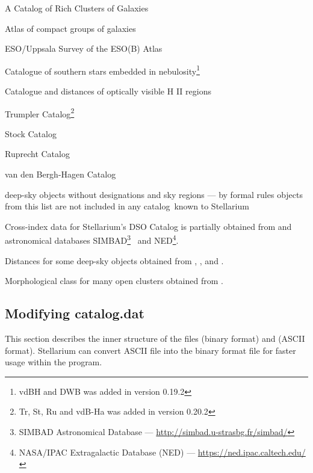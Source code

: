 \begin{description}[align=right,labelwidth=2cm]
\item[\textbf{Abell}]  A Catalog of Rich Clusters of Galaxies~\citep{1989ApJS...70....1A}
\item[\textbf{HCG}]  Atlas of compact groups of galaxies~\citep{1993ApL....29....1H}
\item[\textbf{ESO}]  ESO/Uppsala Survey of the ESO(B) Atlas~\citep{1982ESO...C......0L}
\item[\textbf{vdBH}]  Catalogue of southern stars embedded in nebulosity\footnote{vdBH and DWB was added in version 0.19.2}~\citep{1975AJ.....80..208V}
\item[\textbf{DWB}]  Catalogue and distances of optically visible H II regions~\citep{1969A&A.....1..270D}
\item[\textbf{Tr}]  Trumpler Catalog\footnote{Tr, St, Ru and vdB-Ha was added in version 0.20.2}
\item[\textbf{St}]  Stock Catalog
\item[\textbf{Ru}]  Ruprecht Catalog
\item[\textbf{vdB-Ha}]  van den Bergh-Hagen Catalog~\citep{1975AJ.....80...11V}
\item[\textbf{Other}] deep-sky objects without designations and sky regions --- by formal rules objects from this list are not included in any catalog known to Stellarium
\end{description}

\noindent Cross-index data for Stellarium's DSO Catalog is partially obtained from 
 and astronomical databases 
SIMBAD\footnote{SIMBAD Astronomical Database --- \url{http://simbad.u-strasbg.fr/simbad/}}~\citep{2000A&AS..143....9W} 
and NED\footnote{NASA/IPAC Extragalactic Database (NED) --- \url{https://ned.ipac.caltech.edu/}}.

\noindent Distances for some deep-sky objects obtained from , ,  and .

\noindent Morphological class for many open clusters obtained from .

\subsection{Modifying catalog.dat}
\label{sec:dso:modifyingCatalog.dat}

This section describes the inner structure of the files 
(binary format) and  (ASCII format).
Stellarium can convert ASCII file into the binary format file for faster usage
within the program.

